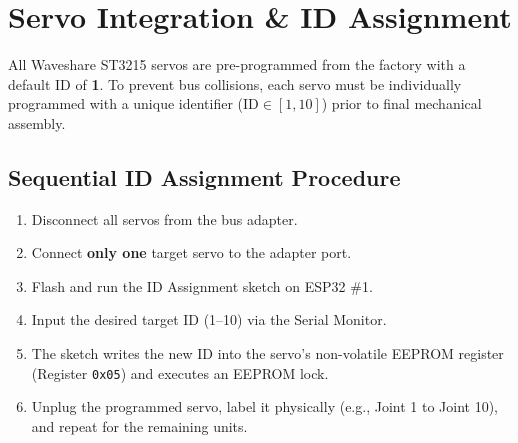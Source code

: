 \documentclass[11pt,a4paper]{article}
\begin{document}
\section{Servo Integration \& ID Assignment}
All Waveshare ST3215 servos are pre-programmed from the factory with a default ID of \textbf{1}. To prevent bus collisions, each servo must be individually programmed with a unique identifier ($\text{ID} \in [1, 10]$) prior to final mechanical assembly.

\subsection{Sequential ID Assignment Procedure}
\begin{enumerate}[leftmargin=1.5em, itemsep=0.2em]
    \item Disconnect all servos from the bus adapter.
    \item Connect \textbf{only one} target servo to the adapter port.
    \item Flash and run the ID Assignment sketch on ESP32 \#1.
    \item Input the desired target ID (1--10) via the Serial Monitor.
    \item The sketch writes the new ID into the servo's non-volatile EEPROM register (Register \texttt{0x05}) and executes an EEPROM lock.
    \item Unplug the programmed servo, label it physically (e.g., Joint 1 to Joint 10), and repeat for the remaining units.
\end{enumerate}
\end{document}
